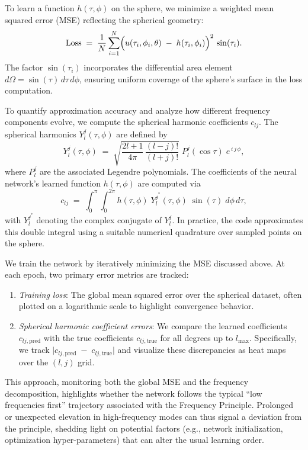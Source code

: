 \documentclass[review,onefignum,onetabnum,onealgnum]{siamart250106}
\numberwithin{theorem}{section}
\begin{document}
To learn a function \(h(\tau,\phi)\) on the sphere, we minimize a weighted mean squared error (MSE) reflecting the spherical geometry:
\[
    \mathrm{Loss} 
    \;=\; \frac{1}{N} \sum_{i=1}^N 
        \Bigl(
            u(\tau_i,\phi_i,\theta)
            \;-\;
            h(\tau_i,\phi_i)
        \Bigr)^2
        \,\sin(\tau_i).
\]
The factor \(\sin(\tau_i)\) incorporates the differential area element \(d\Omega=\sin(\tau)\,d\tau\,d\phi\), ensuring uniform coverage of the sphere's surface in the loss computation.

To quantify approximation accuracy and analyze how different frequency components evolve, we compute the spherical harmonic coefficients \(c_{lj}\). The spherical harmonics \(Y_{l}^{j}(\tau,\phi)\) are defined by
\[
    Y_{l}^{j}(\tau,\phi)
    \;=\;
    \sqrt{\frac{2l+1}{4\pi}\,\frac{(l-j)!}{(l+j)!}}\;
    P_l^j(\cos\tau)\;e^{\,i\,j\,\phi},
\]
where \(P_l^j\) are the associated Legendre polynomials. The coefficients of the neural network's learned function \(h(\tau,\phi)\) are computed via
\[
    c_{lj}
    \;=\;
    \int_0^\pi\!\int_0^{2\pi}
        h(\tau,\phi)\;Y_{l}^{j^*}(\tau,\phi)\;\sin(\tau)\;d\phi\,d\tau,
\]
with \(Y_{l}^{j^*}\) denoting the complex conjugate of \(Y_{l}^{j}\). In practice, the code approximates this double integral using a suitable numerical quadrature over sampled points on the sphere.

We train the network by iteratively minimizing the MSE discussed above. At each epoch, two primary error metrics are tracked:
\begin{enumerate}
    \item \textit{Training loss}: The global mean squared error over the spherical dataset, often plotted on a logarithmic scale to highlight convergence behavior.
    \item \textit{Spherical harmonic coefficient errors}: We compare the learned coefficients \(c_{lj,\mathrm{pred}}\) with the true coefficients \(c_{lj,\mathrm{true}}\) for all degrees up to \(l_{\max}\). Specifically, we track 
    \(\bigl|c_{lj,\mathrm{pred}} \;-\; c_{lj,\mathrm{true}}\bigr|\) and visualize these discrepancies as heat maps over the \((l,j)\) grid.
\end{enumerate}
This approach, monitoring both the global MSE and the frequency decomposition, highlights whether the network follows the typical “low frequencies first” trajectory associated with the Frequency Principle. Prolonged or unexpected elevation in high-frequency modes can thus signal a deviation from the principle, shedding light on potential factors (e.g., network initialization, optimization hyper-parameters) that can alter the usual learning order.
\end{document}
